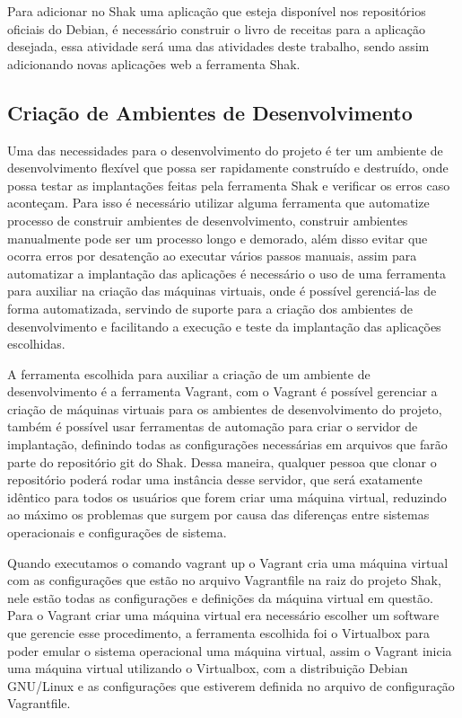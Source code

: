 Para adicionar no Shak uma aplicação que esteja disponível nos repositórios oficiais
do Debian, é necessário construir o livro de receitas para a
aplicação desejada, essa atividade será uma das atividades deste trabalho, sendo assim
adicionando novas aplicações web a ferramenta Shak.

\subsection{Criação de Ambientes de Desenvolvimento}

Uma das necessidades para o desenvolvimento do projeto é ter um ambiente de desenvolvimento
flexível que possa ser rapidamente construído e destruído, onde possa testar as
implantações feitas pela ferramenta Shak e verificar os erros caso aconteçam. Para isso é necessário utilizar
alguma ferramenta que automatize processo de construir ambientes de desenvolvimento,
construir ambientes manualmente pode
ser um processo longo e demorado, além disso evitar que ocorra erros por
desatenção ao executar vários passos manuais, assim para automatizar a implantação
das aplicações é necessário o uso de uma ferramenta para auxiliar na criação das
máquinas virtuais, onde é possível gerenciá-las de forma automatizada, servindo de
suporte para a criação dos ambientes de desenvolvimento e facilitando a execução e teste da implantação das
aplicações escolhidas.

A ferramenta escolhida para auxiliar a criação de um ambiente de desenvolvimento é
a ferramenta Vagrant, com o Vagrant é possível gerenciar a criação de máquinas
virtuais para os ambientes de desenvolvimento do projeto, também é possível usar
ferramentas de automação para criar o servidor de implantação, definindo todas
as configurações necessárias
em arquivos que farão parte do repositório git do Shak. Dessa maneira,
qualquer pessoa que clonar o repositório poderá rodar uma instância desse servidor, que será exatamente
idêntico para todos os usuários que forem criar uma máquina virtual, reduzindo ao
máximo os problemas que surgem por causa das diferenças entre sistemas operacionais e configurações de sistema.

Quando executamos o comando vagrant up o Vagrant cria uma máquina virtual com as
configurações que estão no arquivo Vagrantfile na raiz do projeto Shak, nele
estão todas as configurações e definições da máquina virtual em questão. Para o
Vagrant criar uma máquina virtual era necessário escolher um software que gerencie
esse procedimento, a ferramenta escolhida foi o Virtualbox para poder emular o sistema
operacional uma máquina virtual, assim o Vagrant inicia uma máquina virtual
utilizando o Virtualbox, com a distribuição Debian GNU/Linux e as configurações que estiverem
definida no arquivo de configuração Vagrantfile.

